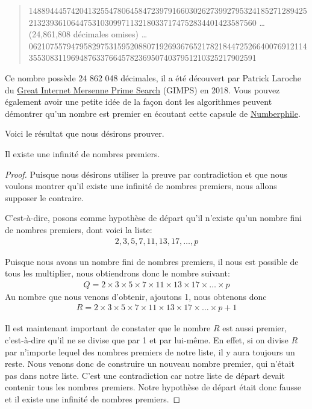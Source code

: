 \documentclass[]{book}
\theoremstyle{definition}
\theoremstyle{definition}
\theoremstyle{definition}
\theoremstyle{remark}
\let\BeginKnitrBlock\begin \let\EndKnitrBlock\end
\begin{document}
\begin{quote}
148894445742041325547806458472397916603026273992795324185271289425213239361064475310309971132180337174752834401423587560 \ldots{}
(24,861,808 décimales omises)
\ldots{} 062107557947958297531595208807192693676521782184472526640076912114355308311969487633766457823695074037951210325217902591
\end{quote}

Ce nombre possède 24 862 048 décimales, il a été découvert par Patrick Laroche du \href{https://en.wikipedia.org/wiki/Great_Internet_Mersenne_Prime_Search}{Great Internet Mersenne Prime Search} (GIMPS) en 2018. Vous pouvez également avoir une petite idée de la façon dont les algorithmes peuvent démontrer qu'un nombre est premier en écoutant cette capsule de \href{https://www.youtube.com/watch?v=tlpYjrbujG0}{Numberphile}.

Voici le résultat que nous désirons prouver.
\BeginKnitrBlock{theorem}
\protect\hypertarget{thm:unnamed-chunk-243}{}{\label{thm:unnamed-chunk-243} }Il existe une infinité de nombres premiers.
\EndKnitrBlock{theorem}

\BeginKnitrBlock{proof}
{}Puisque nous désirons utiliser la preuve par contradiction et que nous voulons montrer qu'il existe une infinité de nombres premiers, nous allons supposer le contraire.

C'est-à-dire, posons comme hypothèse de départ qu'il n'existe qu'un nombre fini de nombres premiers, dont voici la liste:
\begin{align*}
2,3,5,7,11,13,17,\ldots,p
\end{align*}

Puisque nous avons un nombre fini de nombres premiers, il nous est possible de tous les multiplier, nous obtiendrons donc le nombre suivant:
\begin{align*}
Q=2\times 3 \times 5 \times 7 \times 11 \times 13 \times 17 \times \ldots \times p
\end{align*}
Au nombre que nous venons d'obtenir, ajoutons 1, nous obtenons donc
\begin{align*}
R=2\times 3 \times 5 \times 7 \times 11 \times 13 \times 17 \times \ldots \times p + 1
\end{align*}

Il est maintenant important de constater que le nombre \(R\) est aussi premier, c'est-à-dire qu'il ne se divise que par 1 et par lui-même. En effet, si on divise \(R\) par n'importe lequel des nombres premiers de notre liste, il y aura toujours un reste. Nous venons donc de construire un nouveau nombre premier, qui n'était pas dans notre liste. C'est une contradiction car notre liste de départ devait contenir tous les nombres premiers. Notre hypothèse de départ était donc fausse et il existe une infinité de nombres premiers.
\EndKnitrBlock{proof}
\end{document}
